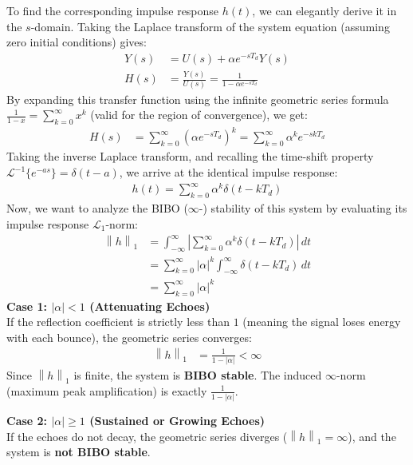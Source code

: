\documentclass[11pt, a4paper, twoside]{article}
\newcommand{\norm}[1]{\left\lVert#1\right\rVert}
\newcommand{\abs}[1]{\left\lvert#1\right\rvert}
\theoremstyle{plain}
\theoremstyle{definition}
\begin{document}
To find the corresponding impulse response $h(t)$, we can elegantly derive it in the $s$-domain. Taking the Laplace transform of the system equation (assuming zero initial conditions) gives:
%
\begin{align*}
    Y(s) &= U(s) + \alpha e^{-s T_d} Y(s) \\
    H(s) &= \frac{Y(s)}{U(s)} = \frac{1}{1 - \alpha e^{-s T_d}}
\end{align*}
%
By expanding this transfer function using the infinite geometric series formula $\frac{1}{1-x} = \sum_{k=0}^{\infty} x^k$ (valid for the region of convergence), we get:
%
\begin{align*}
    H(s) &= \sum_{k=0}^{\infty} \left( \alpha e^{-s T_d} \right)^k = \sum_{k=0}^{\infty} \alpha^k e^{-s k T_d}
\end{align*}
%
Taking the inverse Laplace transform, and recalling the time-shift property $\mathcal{L}^{-1}\{e^{-as}\} = \delta(t-a)$, we arrive at the identical impulse response:
%
\begin{align*}
    h(t) = \sum_{k=0}^{\infty} \alpha^k \delta(t - k T_d)
\end{align*}
%
Now, we want to analyze the BIBO ($\infty$-) stability of this system by evaluating its impulse response $\mathcal{L}_1$-norm:
%
\begin{align*}
    \norm{h}_1 &= \int_{-\infty}^{\infty} \abs{ \sum_{k=0}^{\infty} \alpha^k \delta(t - k T_d) } \, dt \\
    &= \sum_{k=0}^{\infty} \abs{\alpha}^k \int_{-\infty}^{\infty} \delta(t - k T_d) \, dt \\
    &= \sum_{k=0}^{\infty} \abs{\alpha}^k
\end{align*}
%
\textbf{Case 1: $\abs{\alpha} < 1$ (Attenuating Echoes)} \\
If the reflection coefficient is strictly less than $1$ (meaning the signal loses energy with each bounce), the geometric series converges:
%
\begin{align*}
    \norm{h}_1 &= \frac{1}{1 - \abs{\alpha}} < \infty
\end{align*}
%
Since $\norm{h}_1$ is finite, the system is \textbf{BIBO stable}. The induced $\infty$-norm (maximum peak amplification) is exactly $\frac{1}{1 - \abs{\alpha}}$.

\textbf{Case 2: $\abs{\alpha} \geq 1$ (Sustained or Growing Echoes)} \\
If the echoes do not decay, the geometric series diverges ($\norm{h}_1 = \infty$), and the system is \textbf{not BIBO stable}.
\end{document}
